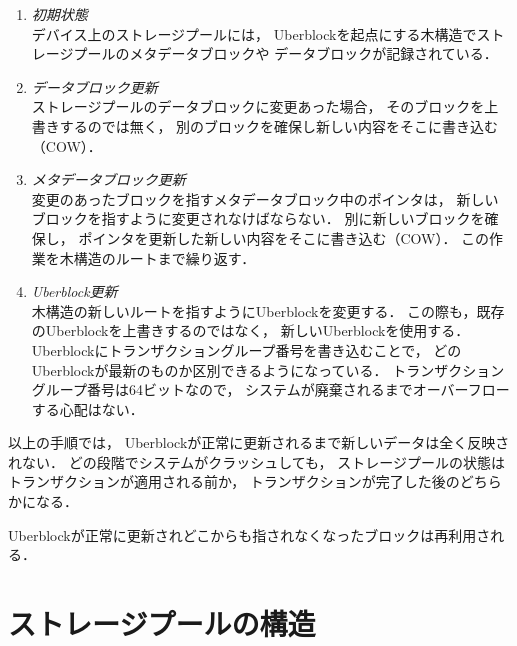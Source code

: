 \begin{enumerate}
\item \emph{初期状態} \\
  デバイス上のストレージプールには，
  Uberblockを起点にする木構造でストレージプールのメタデータブロックや
  データブロックが記録されている．
\item \emph{データブロック更新} \\
  ストレージプールのデータブロックに変更あった場合，
  そのブロックを上書きするのでは無く，
  別のブロックを確保し新しい内容をそこに書き込む（COW）．
\item \emph{メタデータブロック更新} \\
  変更のあったブロックを指すメタデータブロック中のポインタは，
  新しいブロックを指すように変更されなけばならない．
  別に新しいブロックを確保し，
  ポインタを更新した新しい内容をそこに書き込む（COW）．
  この作業を木構造のルートまで繰り返す．
\item \emph{Uberblock更新} \\
  木構造の新しいルートを指すようにUberblockを変更する．
  この際も，既存のUberblockを上書きするのではなく，
  新しいUberblockを使用する．
  Uberblockにトランザクショングループ番号を書き込むことで，
  どのUberblockが最新のものか区別できるようになっている．
  トランザクショングループ番号は64ビットなので，
  システムが廃棄されるまでオーバーフローする心配はない．
\end{enumerate}

以上の手順では，
Uberblockが正常に更新されるまで新しいデータは全く反映されない．
どの段階でシステムがクラッシュしても，
ストレージプールの状態はトランザクションが適用される前か，
トランザクションが完了した後のどちらかになる．

Uberblockが正常に更新されどこからも指されなくなったブロックは再利用される．

\section{ストレージプールの構造}

